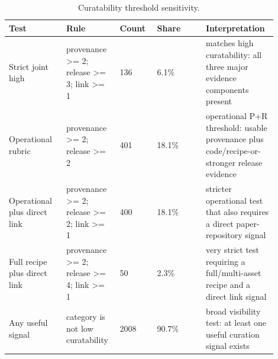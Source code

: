 \begin{table}[t]
\centering
\caption{Curatability threshold sensitivity.}
\label{tab:curatability-sensitivity}
\small
\begin{tabular}{p{0.20\linewidth}p{0.18\linewidth}p{0.13\linewidth}p{0.17\linewidth}p{0.22\linewidth}}
\toprule
Test & Rule & Count & Share & Interpretation \\
\midrule
Strict joint high & provenance >= 2; release >= 3; link >= 1 & 136 & 6.1\% & matches high curatability: all three major evidence components present \\
Operational rubric & provenance >= 2; release >= 2 & 401 & 18.1\% & operational P+R threshold: usable provenance plus code/recipe-or-stronger release evidence \\
Operational plus direct link & provenance >= 2; release >= 2; link >= 1 & 400 & 18.1\% & stricter operational test that also requires a direct paper-repository signal \\
Full recipe plus direct link & provenance >= 2; release >= 4; link >= 1 & 50 & 2.3\% & very strict test requiring a full/multi-asset recipe and a direct link signal \\
Any useful signal & category is not low curatability & 2008 & 90.7\% & broad visibility test: at least one useful curation signal exists \\
\bottomrule
\end{tabular}
\end{table}
